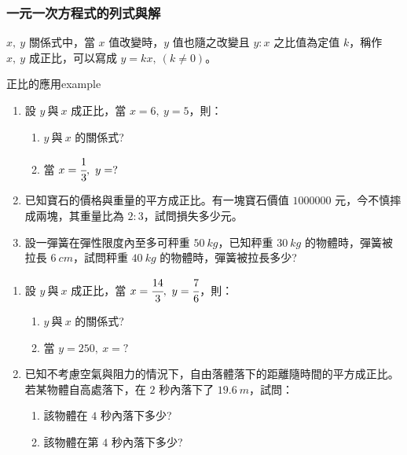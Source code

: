 \documentclass[bwprint,a4paper]{extarticle}
\begin{document}
\subsubsection{一元一次方程式的列式與解}
{\hspace{0.5cm}$x,\ y$ 關係式中，當 $x$ 值改變時，$y$ 值也隨之改變且 $y:x$ 之比值為定值 $k$，稱作 $x,\ y$ 成正比，可以寫成 $y=kx,\ (k\neq0)$。
}
\begin{question}{正比的應用}{example}
	\begin{enumerate}
		\item 設 $y\ \text{與}\ x$ 成正比，當 $x=6,\ y=5$，則：
		\begin{enumerate}[label=(\arabic*)]
			\item $y\ \text{與}\ x$ 的關係式?
			\item 當 $x=\cfrac13,\ y=?$
		\end{enumerate}
		\item 已知寶石的價格與重量的平方成正比。有一塊寶石價值 $1000000$ 元，今不慎摔成兩塊，其重量比為 $2:3$，試問損失多少元。
		\item 設一彈簧在彈性限度內至多可秤重 $50\ kg$，已知秤重 $30\ kg$ 的物體時，彈簧被拉長 $6\ cm$，試問秤重 $40\ kg$ 的物體時，彈簧被拉長多少?
	\end{enumerate}	
\end{question}
\newpage
\begin{observing}
	\begin{enumerate}
		\item 設 $y\ \text{與}\ x$ 成正比，當 $x=\cfrac{14}3,\ y=\cfrac76$，則：
		\begin{enumerate}[label=(\arabic*)]
			\item $y\ \text{與}\ x$ 的關係式?
			\item 當 $y=250,\ x=?$
		\end{enumerate}
		\item 已知不考慮空氣與阻力的情況下，自由落體落下的距離隨時間的平方成正比。若某物體自高處落下，在 $2$ 秒內落下了 $19.6\ m$，試問：
		\begin{enumerate}[label=(\arabic*)]
			\item 該物體在 $4$ 秒內落下多少?
			\item 該物體在第 $4$ 秒內落下多少?
		\end{enumerate}
	\end{enumerate}	
\end{observing}
\vspace{45ex}
\end{document}
